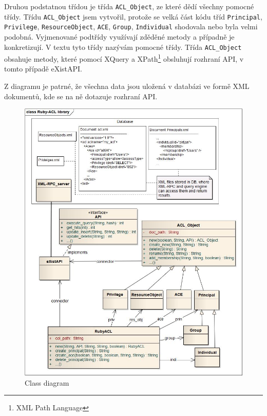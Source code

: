 Druhou podstatnou třídou je třída \verb|ACL_Object|, ze které dědí všechny pomocné třídy. Třídu \verb|ACL_Object| jsem vytvořil, protože se velká část kódu tříd \verb|Principal|, \verb|Privilege|, \verb|ResourceObject|, \verb|ACE|, \verb|Group|, \verb|Individual| shodovala nebo byla velmi podobná. Vyjmenované podtřídy využívají zděděné metody a případně je konkretizují. V textu tyto třídy nazývám pomocné třídy.
Třída  \verb|ACL_Object| obsahuje metody, které pomocí XQuery a XPath\footnote{XML Path Language} obsluhují rozhraní API, v tomto případě eXistAPI.

Z diagramu je patrné, že všechna data jsou uložená v databázi ve formě XML dokumentů, kde se na ně dotazuje rozhraní API.

\begin{figure}
\includegraphics[width=15cm]{Ruby-ACL.jpg}
\caption{Class diagram}
\label{fig:Class diagram}
\end{figure}




